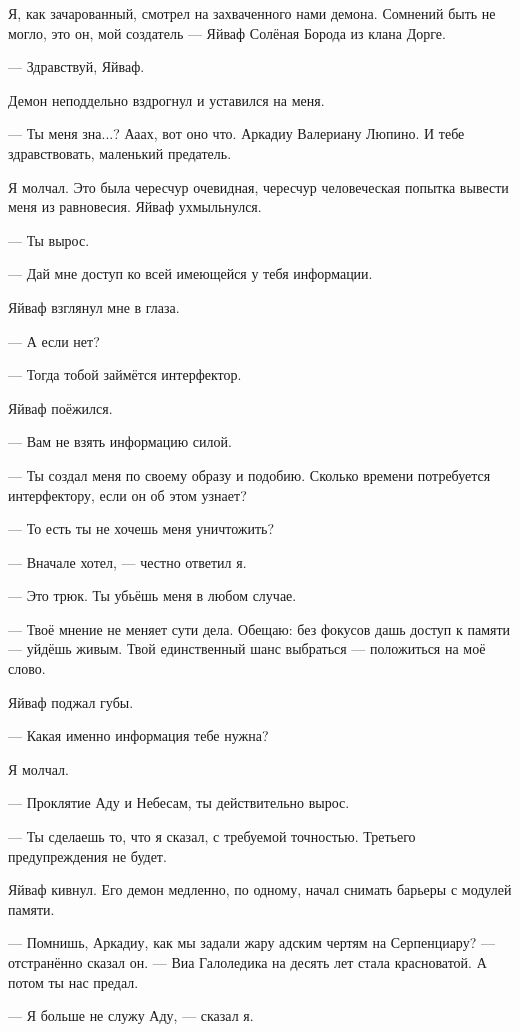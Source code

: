\textspace

Я, как зачарованный, смотрел на захваченного нами демона.
Сомнений быть не могло, это он, мой создатель --- Яйваф Солёная Борода из клана Дорге.

--- Здравствуй, Яйваф.

Демон неподдельно вздрогнул и уставился на меня.

--- Ты меня зна...?
Ааах, вот оно что.
Аркадиу Валериану Люпино.
И тебе здравствовать, маленький предатель.

Я молчал.
Это была чересчур очевидная, чересчур человеческая попытка вывести меня из равновесия.
Яйваф ухмыльнулся.

--- Ты вырос.

--- Дай мне доступ ко всей имеющейся у тебя информации.

Яйваф взглянул мне в глаза.

--- А если нет?

--- Тогда тобой займётся интерфектор.

Яйваф поёжился.

--- Вам не взять информацию силой.

--- Ты создал меня по своему образу и подобию.
Сколько времени потребуется интерфектору, если он об этом узнает?

--- То есть ты не хочешь меня уничтожить?

--- Вначале хотел, --- честно ответил я.

--- Это трюк.
Ты убьёшь меня в любом случае.

--- Твоё мнение не меняет сути дела.
Обещаю: без фокусов дашь доступ к памяти --- уйдёшь живым.
Твой единственный шанс выбраться --- положиться на моё слово.

Яйваф поджал губы.

--- Какая именно информация тебе нужна?

Я молчал.

--- Проклятие Аду и Небесам, ты действительно вырос.

--- Ты сделаешь то, что я сказал, с требуемой точностью.
Третьего предупреждения не будет.

Яйваф кивнул.
Его демон медленно, по одному, начал снимать барьеры с модулей памяти.

--- Помнишь, Аркадиу, как мы задали жару адским чертям на Серпенциару? --- отстранённо сказал он.
--- Виа Галоледика на десять лет стала красноватой.
А потом ты нас предал.

--- Я больше не служу Аду, --- сказал я.

